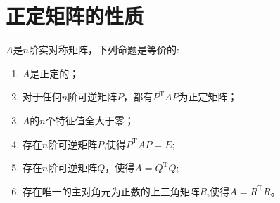 \section{正定矩阵的性质}
\begin{theorem}\label{main:1}
    $A$是$n$阶实对称矩阵，下列命题是等价的:
    \begin{enumerate}
        \item  $A$是正定的；\label{prop:1_1}
        \item 对于任何$n$阶可逆矩阵$P$，都有$P^\mathrm{T}AP$为正定矩阵；\label{prop:1_2}
        \item $A$的$n$个特征值全大于零；\label{prop:1_3}
        \item 存在$n$阶可逆矩阵$P$,使得$P^\mathrm{T}AP=E$;\label{prop:1_4}
        \item 存在$n$阶可逆矩阵$Q$，使得$A=Q^\mathrm{T}Q$;\label{prop:1_5}
        \item 存在唯一的主对角元为正数的上三角矩阵$R$,使得$A=R^\mathrm{T}R$。\label{prop:1_6}
    \end{enumerate}
\end{theorem}
